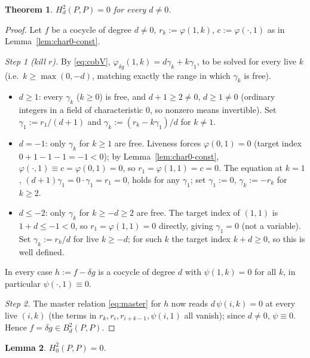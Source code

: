 \documentclass[11pt,reqno]{amsart}
\theoremstyle{plain}
\newtheorem{theorem}{Theorem}[section]
\newtheorem{lemma}[theorem]{Lemma}
\theoremstyle{definition}
\newcommand{\Bt}{B^2}
\newcommand{\Ht}{H^2}
\begin{document}
\begin{theorem}\label{thm:char0-vanish}
$\Ht_d(P,P)=0$ for every $d\ne0$.
\end{theorem}

\begin{proof}
Let $f$ be a cocycle of degree $d\ne0$, $r_k:=\varphi(1,k)$, $c:=\varphi(\cdot,1)$ as in
Lemma~\ref{lem:char0-const}.

\emph{Step 1 (kill $r$).} By \eqref{eq:cobV}, $\varphi_{\delta g}(1,k)=d\gamma_k+k\gamma_1$,
to be solved for every live $k$ (i.e.\ $k\ge\max(0,-d)$, matching exactly the range in which
$\gamma_k$ is free).
\begin{itemize}[leftmargin=2em]
\item $d\ge1$: every $\gamma_k$ ($k\ge0$) is free, and $d+1\ge2\ne0$, $d\ge1\ne0$ (ordinary
integers in a field of characteristic $0$, so nonzero means invertible). Set
$\gamma_1:=r_1/(d+1)$ and $\gamma_k:=(r_k-k\gamma_1)/d$ for $k\ne1$.
\item $d=-1$: only $\gamma_k$ for $k\ge1$ are free. Liveness forces $\varphi(0,1)=0$ (target
index $0+1-1-1=-1<0$); by Lemma~\ref{lem:char0-const}, $\varphi(\cdot,1)\equiv c=\varphi(0,1)=0$,
so $r_1=\varphi(1,1)=c=0$. The equation at $k=1$, $(d+1)\gamma_1=0\cdot\gamma_1=r_1=0$, holds
for any $\gamma_1$; set $\gamma_1:=0$, $\gamma_k:=-r_k$ for $k\ge2$.
\item $d\le-2$: only $\gamma_k$ for $k\ge-d\ge2$ are free. The target index of $(1,1)$ is
$1+d\le-1<0$, so $r_1=\varphi(1,1)=0$ directly, giving $\gamma_1=0$ (not a variable). Set
$\gamma_k:=r_k/d$ for live $k\ge-d$; for such $k$ the target index $k+d\ge0$, so this is
well defined.
\end{itemize}
In every case $h:=f-\delta g$ is a cocycle of degree $d$ with $\psi(1,k)=0$ for all $k$, in
particular $\psi(\cdot,1)\equiv0$.

\emph{Step 2.} The master relation \eqref{eq:master} for $h$ now reads $d\,\psi(i,k)=0$ at
every live $(i,k)$ (the terms in $r_k,r_i,r_{i+k-1},\psi(i,1)$ all vanish); since $d\ne0$,
$\psi\equiv0$. Hence $f=\delta g\in\Bt_d(P,P)$.
\end{proof}

\begin{lemma}\label{lem:char0-zero}
$\Ht_0(P,P)=0$.
\end{lemma}
\end{document}
